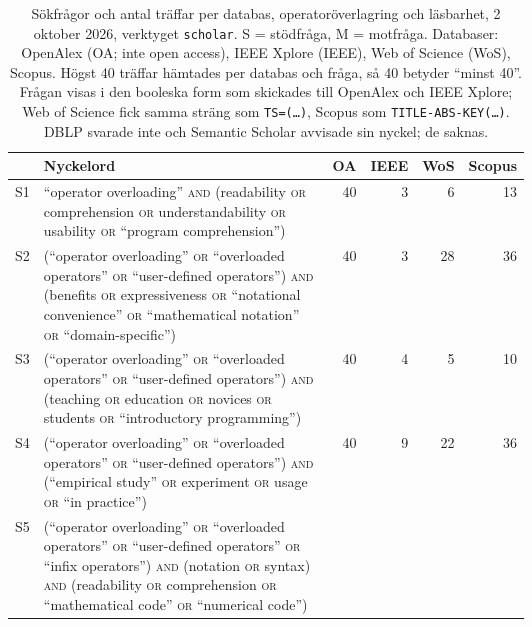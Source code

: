 \begin{table}[!b]
  \caption{Sökfrågor och antal träffar per databas,
    operatoröverlagring och läsbarhet, 2 oktober 2026, verktyget
    \texttt{scholar}.  S = stödfråga, M = motfråga.  Databaser: OpenAlex
    (OA; inte \foreignlanguage{english}{open access}), IEEE Xplore
    (IEEE), Web of Science (WoS), Scopus.  Högst 40 träffar hämtades per
    databas och fråga, så 40 betyder \enquote{minst 40}.  Frågan visas i
    den booleska form som skickades till OpenAlex och IEEE Xplore; Web
    of Science fick samma sträng som \texttt{TS=(\dots)}, Scopus som
    \texttt{TITLE-ABS-KEY(\dots)}.  DBLP svarade inte och Semantic
    Scholar avvisade sin nyckel; de saknas.}
  \label{tab:sok-queries-overlagring}
    \centering\scriptsize
    \begin{tabular}{@{}lp{0.6\linewidth}rrrr@{}}
      \toprule
      & Nyckelord & OA & IEEE & WoS & Scopus \\
      \midrule
      S1 & \enquote{operator overloading} \textsc{and} (readability \textsc{or} comprehension \textsc{or} understandability \textsc{or} usability \textsc{or} \enquote{program comprehension})
         & 40 & 3 & 6 & 13 \\
      S2 & (\enquote{operator overloading} \textsc{or} \enquote{overloaded operators} \textsc{or} \enquote{user-defined operators}) \textsc{and} (benefits \textsc{or} expressiveness \textsc{or} \enquote{notational convenience} \textsc{or} \enquote{mathematical notation} \textsc{or} \enquote{domain-specific})
         & 40 & 3 & 28 & 36 \\
      S3 & (\enquote{operator overloading} \textsc{or} \enquote{overloaded operators} \textsc{or} \enquote{user-defined operators}) \textsc{and} (teaching \textsc{or} education \textsc{or} novices \textsc{or} students \textsc{or} \enquote{introductory programming})
         & 40 & 4 & 5 & 10 \\
      S4 & (\enquote{operator overloading} \textsc{or} \enquote{overloaded operators} \textsc{or} \enquote{user-defined operators}) \textsc{and} (\enquote{empirical study} \textsc{or} experiment \textsc{or} usage \textsc{or} \enquote{in practice})
         & 40 & 9 & 22 & 36 \\
      S5 & (\enquote{operator overloading} \textsc{or} \enquote{overloaded operators} \textsc{or} \enquote{user-defined operators} \textsc{or} \enquote{infix operators}) \textsc{and} (notation \textsc{or} syntax) \textsc{and} (readability \textsc{or} comprehension \textsc{or} \enquote{mathematical code} \textsc{or} \enquote{numerical code})

\end{tabular}
\end{table}
